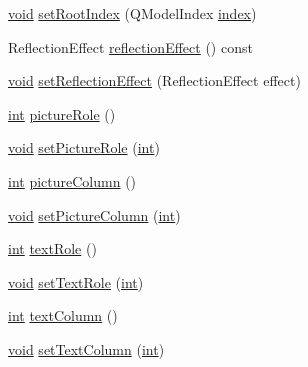 \begin{DoxyCompactItemize}
\item 
\hyperlink{group___u_a_v_objects_plugin_ga444cf2ff3f0ecbe028adce838d373f5c}{void} \hyperlink{class_qxt_flow_view_a0fff0fe7562af5fe4f0d25fa490ca69c}{set\-Root\-Index} (Q\-Model\-Index \hyperlink{glext_8h_ab47dd9958bcadea08866b42bf358e95e}{index})
\item 
Reflection\-Effect \hyperlink{class_qxt_flow_view_a1db04f46fbab235ad1db025db196439f}{reflection\-Effect} () const 
\item 
\hyperlink{group___u_a_v_objects_plugin_ga444cf2ff3f0ecbe028adce838d373f5c}{void} \hyperlink{class_qxt_flow_view_a4e122a400755973f817062d37dd00769}{set\-Reflection\-Effect} (Reflection\-Effect effect)
\item 
\hyperlink{ioapi_8h_a787fa3cf048117ba7123753c1e74fcd6}{int} \hyperlink{class_qxt_flow_view_adde896cd2f6ebe2427c11e4651ea4b60}{picture\-Role} ()
\item 
\hyperlink{group___u_a_v_objects_plugin_ga444cf2ff3f0ecbe028adce838d373f5c}{void} \hyperlink{class_qxt_flow_view_a1e04d5c5ca32f84d1f2abee56a2303e3}{set\-Picture\-Role} (\hyperlink{ioapi_8h_a787fa3cf048117ba7123753c1e74fcd6}{int})
\item 
\hyperlink{ioapi_8h_a787fa3cf048117ba7123753c1e74fcd6}{int} \hyperlink{class_qxt_flow_view_aa639308437d9c57ef057c7820d27652a}{picture\-Column} ()
\item 
\hyperlink{group___u_a_v_objects_plugin_ga444cf2ff3f0ecbe028adce838d373f5c}{void} \hyperlink{class_qxt_flow_view_abe1047cb939c2e2d7ab65562852dc9d6}{set\-Picture\-Column} (\hyperlink{ioapi_8h_a787fa3cf048117ba7123753c1e74fcd6}{int})
\item 
\hyperlink{ioapi_8h_a787fa3cf048117ba7123753c1e74fcd6}{int} \hyperlink{class_qxt_flow_view_a486c5e4884fb113ffc786130d6bf8915}{text\-Role} ()
\item 
\hyperlink{group___u_a_v_objects_plugin_ga444cf2ff3f0ecbe028adce838d373f5c}{void} \hyperlink{class_qxt_flow_view_aa25697d6533b93905ed2418ea27c29e1}{set\-Text\-Role} (\hyperlink{ioapi_8h_a787fa3cf048117ba7123753c1e74fcd6}{int})
\item 
\hyperlink{ioapi_8h_a787fa3cf048117ba7123753c1e74fcd6}{int} \hyperlink{class_qxt_flow_view_a2f3570c7efd074141a30cb60acda8d69}{text\-Column} ()
\item 
\hyperlink{group___u_a_v_objects_plugin_ga444cf2ff3f0ecbe028adce838d373f5c}{void} \hyperlink{class_qxt_flow_view_a83a490073c8eb9cd89316b4746507210}{set\-Text\-Column} (\hyperlink{ioapi_8h_a787fa3cf048117ba7123753c1e74fcd6}{int})
\end{DoxyCompactItemize}
